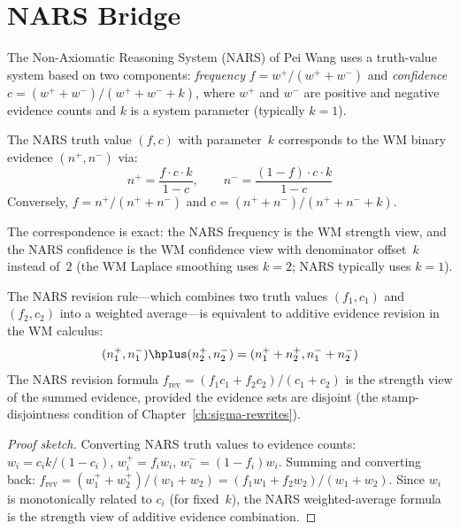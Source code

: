 \section{NARS Bridge}
\label{sec:bridge-nars}

The Non-Axiomatic Reasoning System (NARS) of Pei Wang uses a
truth-value system based on two components: \emph{frequency}
$f = w^+ / (w^+ + w^-)$ and \emph{confidence}
$c = (w^+ + w^-) / (w^+ + w^- + k)$, where $w^+$ and $w^-$ are
positive and negative evidence counts and $k$ is a system parameter
(typically $k = 1$).

\begin{definition}
\label{def:nars-bridge}
The NARS truth value $(f, c)$ with parameter~$k$ corresponds to the
WM binary evidence $(n^+, n^-)$ via:
\[
  n^+ = \frac{f \cdot c \cdot k}{1 - c}, \qquad
  n^- = \frac{(1-f) \cdot c \cdot k}{1 - c}
\]
Conversely, $f = n^+ / (n^+ + n^-)$ and
$c = (n^+ + n^-) / (n^+ + n^- + k)$.
\end{definition}

\noindent
The correspondence is exact: the NARS frequency is the WM strength
view, and the NARS confidence is the WM confidence view with
denominator offset~$k$ instead of~$2$ (the WM Laplace smoothing
uses $k = 2$; NARS typically uses $k = 1$).

\begin{theorem}
\label{thm:nars-revision}
The NARS revision rule---which combines two truth values
$(f_1, c_1)$ and $(f_2, c_2)$ into a weighted average---is
equivalent to additive evidence revision in the WM calculus:
\[
  (n_1^+, n_1^-) \hplus (n_2^+, n_2^-) = (n_1^+ + n_2^+, n_1^- + n_2^-)
\]
The NARS revision formula
$f_{\mathrm{rev}} = (f_1 c_1 + f_2 c_2) / (c_1 + c_2)$
is the strength view of the summed evidence, provided the evidence
sets are disjoint (the stamp-disjointness condition of
Chapter~\ref{ch:sigma-rewrites}).
\end{theorem}

\begin{proof}[Proof sketch]
Converting NARS truth values to evidence counts:
$w_i = c_i k / (1 - c_i)$, $w_i^+ = f_i w_i$, $w_i^- = (1-f_i) w_i$.
Summing and converting back:
$f_{\mathrm{rev}} = (w_1^+ + w_2^+) / (w_1 + w_2)
= (f_1 w_1 + f_2 w_2) / (w_1 + w_2)$.
Since $w_i$ is monotonically related to $c_i$ (for fixed~$k$), the
NARS weighted-average formula is the strength view of additive
evidence combination.
\end{proof}


